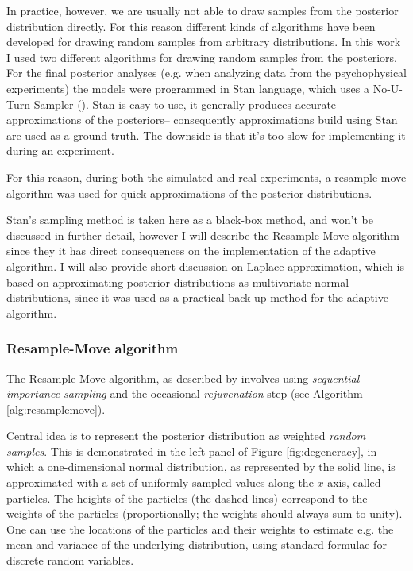 \documentclass{article}\usepackage{knitr}
\begin{document}
In practice, however, we are usually not able to draw samples from the posterior distribution directly. For this reason different kinds of algorithms have been developed for drawing random samples from arbitrary distributions. In this work I used two different algorithms for drawing random samples from the posteriors. For the final posterior analyses (e.g. when analyzing data from the psychophysical experiments) the models were programmed in Stan language, which uses a No-U-Turn-Sampler (\citet[Chapters 15 \& 16]{stan_manual_new}). Stan is easy to use, it generally produces accurate approximations of the posteriors-- consequently approximations build using Stan are used as a ground truth. The downside is that it's too slow for implementing it during an experiment.

For this reason, during both the simulated and real experiments, a resample-move algorithm was used for quick approximations of the posterior distributions.

Stan's sampling method is taken here as a black-box method, and won't be discussed in further detail, however I will describe the Resample-Move algorithm since they it has direct consequences on the implementation of the adaptive algorithm. I will also provide short discussion on Laplace approximation, which is based on approximating posterior distributions as multivariate normal distributions, since it was used as a practical back-up method for the adaptive algorithm.

\subsubsection{Resample-Move algorithm}

The Resample-Move algorithm, as described by \citet{chopin2002} involves using \textit{sequential importance sampling} and the occasional \textit{rejuvenation} step (see Algorithm \ref{alg:resamplemove}).  

Central idea is to represent the posterior distribution as weighted \textit{random samples}. This is demonstrated in the left panel of Figure \ref{fig:degeneracy}, in which a one-dimensional normal distribution, as represented by the solid line, is approximated with a set of uniformly sampled values along the $x$-axis, called particles. The heights of the particles (the dashed lines) correspond to the weights of the particles (proportionally; the weights should always sum to unity). One can use the locations of the particles and their weights to estimate e.g. the mean and variance of the underlying distribution, using standard formulae for discrete random variables.
\end{document}
